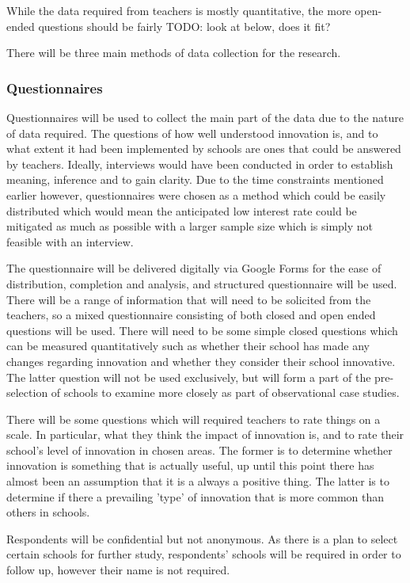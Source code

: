 While the data required from teachers is mostly quantitative, the more open-ended questions should be fairly 
TODO: look at below, does it fit?

There will be three main methods of data collection for the research.

\subsubsection{Questionnaires}
Questionnaires will be used to collect the main part of the data due to the nature of data required. The questions of how well understood innovation is, and to what extent it had been implemented by schools are ones that could be answered by teachers. Ideally, interviews would have been conducted in order to establish meaning, inference and to gain clarity. Due to the time constraints mentioned earlier however, questionnaires were chosen as a method which could be easily distributed which would mean the anticipated low interest rate could be mitigated as much as possible with a larger sample size which is simply not feasible with an interview.

The questionnaire will be delivered digitally via Google Forms for the ease of distribution, completion and analysis, and structured questionnaire will be used. There will be a range of information that will need to be solicited from the teachers, so a mixed questionnaire consisting of both closed and open ended questions will be used. There will need to be some simple closed questions which can be measured quantitatively such as whether their school has made any changes regarding innovation and whether they consider their school innovative. The latter question will not be used exclusively, but will form a part of the pre-selection of schools to examine more closely as part of observational case studies.

There will be some questions which will required teachers to rate things on a scale. In particular, what they think the impact of innovation is, and to rate their school's level of innovation in chosen areas. The former is to determine whether innovation is something that is actually useful, up until this point there has almost been an assumption that it is a always a positive thing. The latter is to determine if there a prevailing 'type' of innovation that is more common than others in schools.

Respondents will be confidential but not anonymous. As there is a plan to select certain schools for further study, respondents' schools will be required in order to follow up, however their name is not required. 

